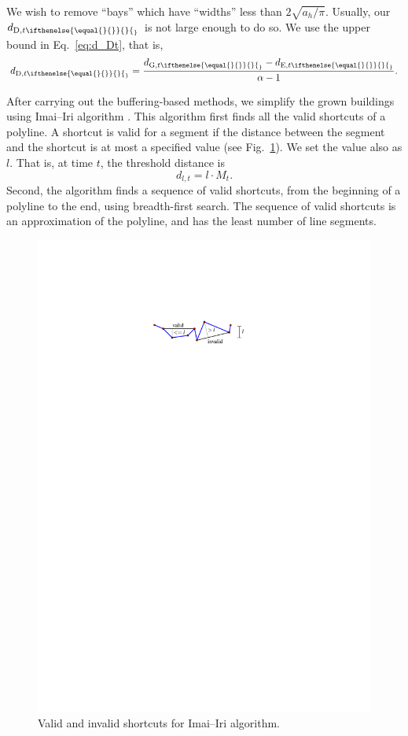 \documentclass[graybox]{svmult}
\newcommand{\fig}{Fig.~}
\newcommand{\eq}{Eq.~}
\newcommand{\dtrm}[2][]{d_{\mathrm{#2}, t\ifthenelse{\equal{#1}{}}{}{_#1}}}
\begin{document}
We wish to remove ``bays'' which have ``widths'' less than $2\sqrt{a_h/\pi}$.
Usually, our $\dtrm{D}$ is not large enough to do so.
We use the upper bound in \eq\ref{eq:d_Dt}, that is,
\[
\dtrm{D} = \frac{\dtrm{G}-\dtrm{E}}{\alpha - 1}.
\]

After carrying out the buffering-based methods, 
we simplify the grown buildings using Imai--Iri algorithm 
\parencite{ImaiIri1988}.
This algorithm first finds all the valid shortcuts of a polyline.
A shortcut is valid for a segment 
if the distance between the segment and the shortcut is at most a specified 
value
(see \fig\ref{fig:ImaiIri_Shortcut}).
We set the value also as $l$.
That is, at time $t$, the threshold distance is
\begin{equation}
\label{eq:d_lt}
d_{l,t}= l \cdot M_t.
\end{equation}
Second, the algorithm finds a sequence of valid shortcuts, from the beginning 
of a polyline to the end, using breadth-first search.
The sequence of valid shortcuts is an approximation of the polyline, 
and has the least number of line segments.

\begin{figure}[tb]
	\centering
	\includegraphics[]{ImaiIri_Shortcut}
	\caption{Valid and invalid shortcuts for Imai--Iri algorithm.}
	\label{fig:ImaiIri_Shortcut}
\end{figure}
\end{document}

